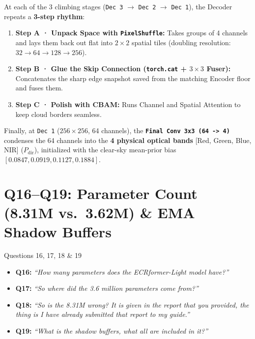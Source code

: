 \documentclass[11pt,a4paper]{article}
\begin{document}
At each of the 3 climbing stages (\texttt{Dec 3} $\to$ \texttt{Dec 2} $\to$ \texttt{Dec 1}), the Decoder repeats a \textbf{3-step rhythm}:
\begin{enumerate}[leftmargin=1.5em]
    \item \textbf{Step A · Unpack Space with \texttt{PixelShuffle}:} Takes groups of 4 channels and lays them back out flat into $2\times 2$ spatial tiles (doubling resolution: $32 \to 64 \to 128 \to 256$).
    \item \textbf{Step B · Glue the Skip Connection (\texttt{torch.cat} + $3\times 3$ Fuser):} Concatenates the sharp edge snapshot saved from the matching Encoder floor and fuses them.
    \item \textbf{Step C · Polish with CBAM:} Runs Channel and Spatial Attention to keep cloud borders seamless.
\end{enumerate}
Finally, at \texttt{Dec 1} ($256 \times 256$, 64 channels), the \textbf{\texttt{Final Conv 3x3 (64 -> 4)}} condenses the 64 channels into the \textbf{4 physical optical bands} [Red, Green, Blue, NIR] ($P_{\text{dir}}$), initialized with the clear-sky mean-prior bias $[0.0847, 0.0919, 0.1127, 0.1884]$.

\bigskip

\section{Q16--Q19: Parameter Count (8.31M vs.\ 3.62M) \& EMA Shadow Buffers}

\begin{questionbox}{Questions 16, 17, 18 \& 19}
\begin{itemize}[leftmargin=1.2em]
    \item \textbf{Q16:} \textit{``How many parameters does the ECRformer-Light model have?''}
    \item \textbf{Q17:} \textit{``So where did the 3.6 million parameters come from?''}
    \item \textbf{Q18:} \textit{``So is the 8.31M wrong? It is given in the report that you provided, the thing is I have already submitted that report to my guide.''}
    \item \textbf{Q19:} \textit{``What is the shadow buffers, what all are included in it?''}
\end{itemize}
\end{questionbox}
\end{document}
